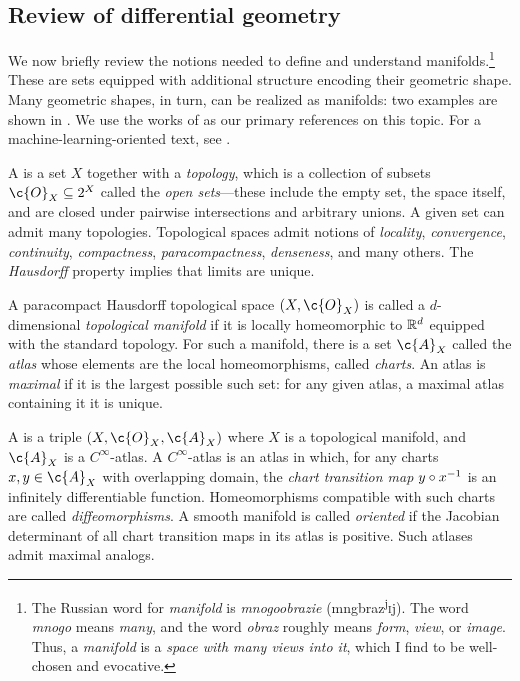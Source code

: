 \documentclass[11pt]{book}
\begin{document}
\subsection{Review of differential geometry}
We now briefly review the notions needed to define and understand manifolds.\footnote{The Russian word for \emph{manifold} is \emph{mnogoobrazie} (mngbr{\textquotesingle}az\textsuperscript{j}\textsc{i}j). The word \emph{mnogo} means \emph{many}, and the word \emph{obraz} roughly means \emph{form}, \emph{view}, or \emph{image}. 
Thus, a \emph{manifold} is a \emph{space with many views into it}, which I find to be well-chosen and evocative.}
These are sets equipped with additional structure encoding their geometric shape.
Many geometric shapes, in turn, can be realized as manifolds: two examples are shown in .
We use the works of \textcite{lee10,lee12,lee18} as our primary references on this topic.
For a machine-learning-oriented text, see \textcite{bronstein21}.

A  is a set $X$ together with a \emph{topology}, which is a collection of subsets $\c{O}_X \subseteq 2^X$ called the \emph{open sets}---these include the empty set, the space itself, and are closed under pairwise intersections and arbitrary unions.
A given set can admit many topologies.
Topological spaces admit notions of \emph{locality}, \emph{convergence}, \emph{continuity}, \emph{compactness}, \emph{paracompactness}, \emph{denseness}, and many others.
The \emph{Hausdorff} property implies that limits are unique.

A paracompact Hausdorff topological space $(X,\c{O}_X)$ is called a $d$-dimensional \emph{topological manifold} if it is locally homeomorphic to $\mathbb{R}^d$ equipped with the standard topology.
For such a manifold, there is a set $\c{A}_X$ called the \emph{atlas} whose elements are the local homeomorphisms, called \emph{charts}.
An atlas is \emph{maximal} if it is the largest possible such set: for any given atlas, a maximal atlas containing it it is unique.

A  is a triple  $(X,\c{O}_X,\c{A}_X)$ where $X$ is a topological manifold, and $\c{A}_X$ is a $C^\infty$-atlas.
A $C^\infty$-atlas is an atlas in which, for any charts $x,y \in \c{A}_X$ with overlapping domain, the \emph{chart transition map} $y\circ x^{-1}$ is an infinitely differentiable function.
Homeomorphisms compatible with such charts are called \emph{diffeomorphisms}.
A smooth manifold is called \emph{oriented} if the Jacobian determinant of all chart transition maps in its atlas is positive.
Such atlases admit maximal analogs.
\end{document}
